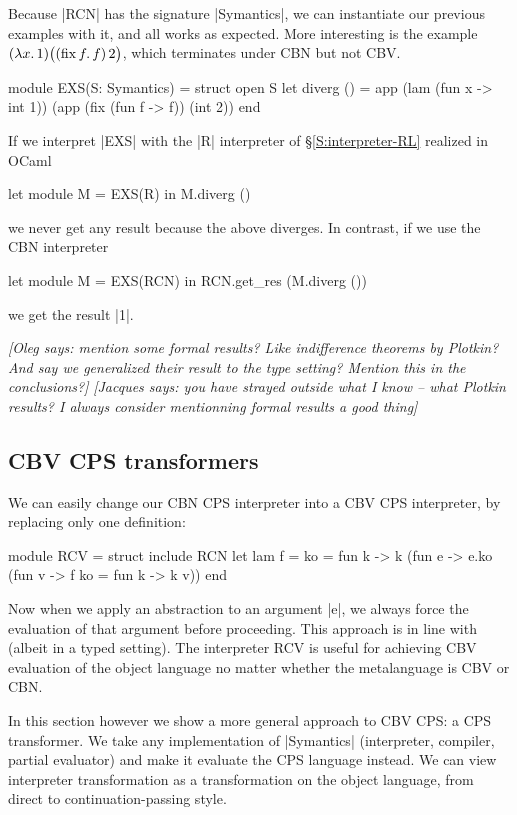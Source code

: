 \documentclass[preprint]{sigplanconf}
\newcommand{\jacques}[1]{{\it [Jacques says: #1]}}
\newcommand{\oleg}[1]{{\it [Oleg says: #1]}}
\newcommand{\fun}[1]{\mathopen{\lambda\mathord{#1}.\,}}
\newcommand{\fix}[1]{\mathopen{\mathrm{fix\,}\mathord{#1}.\,}}
\begin{document}
Because |RCN| has the signature |Symantics|, we can instantiate our previous
examples with it, and all works as expected.  More interesting
is the example $(\fun{x}1)\bigl((\fix{f}f)\mathinner2\bigr)$, which terminates
under CBN but not CBV\@.
\begin{code}
module EXS(S: Symantics) = struct
 open S
 let diverg () = 
   app (lam (fun x -> int 1)) 
       (app (fix (fun f -> f)) (int 2))
end
\end{code}

If we interpret |EXS| with the |R| interpreter of
\S\ref{S:interpreter-RL} realized in OCaml
\begin{code}
let module M = EXS(R) in M.diverg ()
\end{code}
we never get any result because the above diverges. In contrast, if we use
the CBN interpreter
\begin{code}
let module M = EXS(RCN) in RCN.get_res (M.diverg ())
\end{code}
we get the result |1|.

\oleg{mention some formal results? Like indifference theorems by
  Plotkin? And say we generalized their result to the type setting?
  Mention this in the conclusions?}
\jacques{you have strayed outside what I know -- what Plotkin results?
  I always consider mentionning formal results a good thing}

\subsection{CBV CPS transformers}

We can easily change our CBN CPS interpreter into a CBV CPS
interpreter, by replacing only one definition:
\begin{code}
module RCV = struct
  include RCN
  let lam f = {ko = 
    fun k -> k (fun e -> e.ko 
         (fun v -> f {ko = fun k -> k v}))}
end
\end{code}
Now when we apply an abstraction to an argument |e|, we always force
the evaluation of that argument before proceeding. This approach is in
line with \citet{reynolds-relation} (albeit in a typed setting). The interpreter RCV
is useful for achieving CBV evaluation of the object language
no matter whether the metalanguage is CBV or CBN.

In this section however we show a more general approach to CBV CPS:
a CPS transformer. We take any implementation of |Symantics| (interpreter,
compiler, partial evaluator) and make it evaluate the CPS language
instead. We can view interpreter transformation as a
transformation on the object language, from direct to
continuation-passing style.
\end{document}
